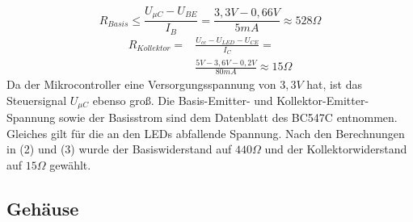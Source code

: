 \documentclass[journal, a4paper]{IEEEtran}
\begin{document}
			\begin{equation}
				R_{Basis} \leq \frac{U_{\mu C}-U_{BE}}{I_B} =  \frac{3,3V-0,66V}{5mA} \approx 528\Omega
			\end{equation}
			\begin{equation}
				\begin{split}
					R_{Kollektor} = & \frac{U_{cc}-U_{LED}-U_{CE}}{I_{C}} = \\ 
					&\frac{5V-3,6V-0,2V}{80mA} \approx 15\Omega
				\end{split}
			\end{equation}
			Da der Mikrocontroller eine Versorgungsspannung von $3,3V$ hat, ist das Steuersignal $U_{\mu C}$ ebenso groß. Die Basis-Emitter- und Kollektor-Emitter-Spannung sowie der Basisstrom sind dem Datenblatt des BC547C entnommen. Gleiches gilt für die an den LEDs abfallende Spannung. Nach den Berechnungen in (2) und (3) wurde der Basiswiderstand auf $440\Omega$ und der Kollektorwiderstand auf  $15\Omega$ gewählt.

		\subsection{Gehäuse}
\end{document}
